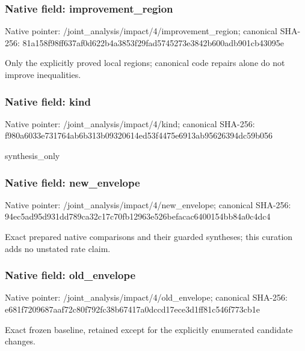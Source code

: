 \documentclass[10pt,a4paper]{article}
\begin{document}
\subsubsection{Native field: improvement\_\allowbreak{}region}
Native pointer: /joint\_\allowbreak{}analysis/impact/4/improvement\_\allowbreak{}region; canonical SHA-256: 81a158f98ff637af0d622b4a3853f29fad5745273e3842b600adb901cb43095e

\begingroup\raggedright\sloppy Only the explicitly proved local regions;\allowbreak{} canonical code repairs alone do not improve inequalities.\par\endgroup

\subsubsection{Native field: kind}
Native pointer: /joint\_\allowbreak{}analysis/impact/4/kind; canonical SHA-256: f980a6033e731764ab6b313b09320614ed53f4475e6913ab95626394dc59b056

\begingroup\raggedright\sloppy synthesis\_\allowbreak{}only\par\endgroup

\subsubsection{Native field: new\_\allowbreak{}envelope}
Native pointer: /joint\_\allowbreak{}analysis/impact/4/new\_\allowbreak{}envelope; canonical SHA-256: 94ec5ad95d931dd789ca32c17c70fb12963e526befacac6400154bb84a0c4dc4

\begingroup\raggedright\sloppy Exact prepared native comparisons and their guarded syntheses;\allowbreak{} this curation adds no unstated rate claim.\par\endgroup

\subsubsection{Native field: old\_\allowbreak{}envelope}
Native pointer: /joint\_\allowbreak{}analysis/impact/4/old\_\allowbreak{}envelope; canonical SHA-256: e681f7209687aaf72c80f792fc38b67417a0dccd17ece3d1ff81c546f773cb1e

\begingroup\raggedright\sloppy Exact frozen baseline,\allowbreak{} retained except for the explicitly enumerated candidate changes.\par\endgroup
\end{document}
